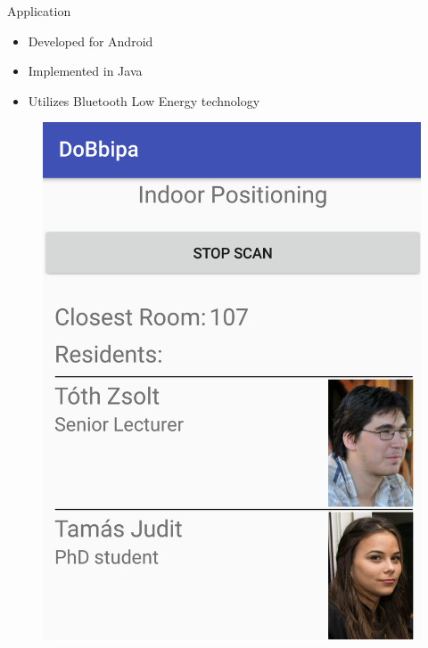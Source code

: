 \documentclass{beamer}
\begin{document}
\begin{frame}[fragile]{Application}
	\begin{minipage}{0.49\textwidth}
		\begin{itemize}
			\item Developed for Android
			\item Implemented in Java
			\item Utilizes Bluetooth Low Energy technology
		\end{itemize}
	\end{minipage}
	\begin{minipage}{0.49\textwidth}
		\begin{figure}
			\includegraphics[width=1\linewidth]{figures/app2.png}
		\end{figure}
	\end{minipage}
\end{frame}
\end{document}
